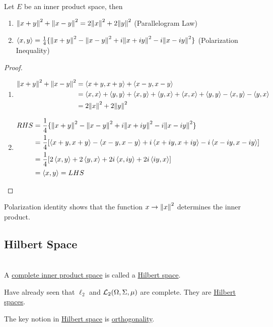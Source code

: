 \begin{proposition}\ \\
Let $E$ be an inner product space, then 
\begin{enumerate}[label = (\alph*)]
    \item $\norm{x + y}^2 + \norm{x - y}^2 = 2\norm{x}^2 + 2 \norm{y}^2$ (Parallelogram Law)
    \item $\left\langle x, y \right\rangle = \frac{1}{4} \{\norm{x + y}^2 - \norm{x - y}^2 + i \norm{x + iy}^2 - i \norm{x - iy}^2\}$ (Polarization Inequality)
\end{enumerate}
\end{proposition}
\begin{proof}\
\begin{enumerate}[label = (\alph*)]
    \item \begin{align*}
        \norm{x+y}^2 + \norm{x - y}^2 &= \left\langle x + y,  x + y \right\rangle + \left\langle x - y, x - y \right\rangle\\
        &= \left\langle x, x \right\rangle + \left\langle y, y \right\rangle +  \left\langle x, y \right\rangle + \left\langle y, x \right\rangle + \left\langle x, x \right\rangle + \left\langle y, y \right\rangle - \left\langle x, y \right\rangle - \left\langle y, x \right\rangle\\
        &= 2 \norm{x}^2 + 2 \norm{y}^2
    \end{align*}
    \item \begin{align*}
        RHS &= \frac{1}{4} \{\norm{x + y}^2 - \norm{x - y}^2 + i \norm{x + iy}^2 - i \norm{x - iy}^2\}\\
        &= \frac{1}{4} [\left\langle x+y, x+y \right\rangle - \left\langle x - y, x - y \right\rangle + i \left\langle x + iy, x + iy \right\rangle - i \left\langle x - iy, x - iy \right\rangle]\\
        &= \frac{1}{4}[2 \left\langle x, y \right\rangle  + 2 \left\langle y, x \right\rangle + 2i\left\langle x, iy \right\rangle + 2 i \left\langle iy, x \right\rangle]\\
        &= \left\langle x, y \right\rangle = LHS
    \end{align*}
\end{enumerate}
\end{proof}
\begin{remark}
    Polarization identity shows that the function $x \to \norm{x}^2$ determines the inner product.
\end{remark}


\vspace{12pt}
\subsection{Hilbert Space}
\begin{definition}\ \\
A \underline{complete inner product space} is called a \underline{Hilbert space}. 
\end{definition}
\begin{remark}
    Have already seen that $\ell_2$ and $\mathcal{L}_2 (\Omega,\Sigma,\mu)$ are complete. They are \underline{Hilbert spaces}.
\end{remark}
\begin{remark}
    The key notion in \underline{Hilbert space} is \underline{orthogonality}.
\end{remark}

